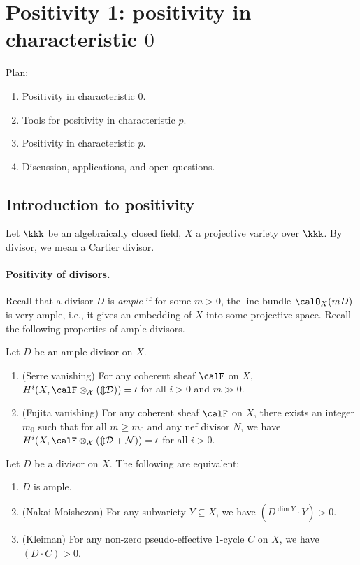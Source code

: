 \section[Positivity 1: positivity in characteristic 0]{Positivity 1: positivity in characteristic $0$}

Plan:
\begin{enumerate}[label=(\arabic*)]
	\item Positivity in characteristic $0$.
	\item Tools for positivity in characteristic $p$.
	\item Positivity in characteristic $p$.
	\item Discussion, applications, and open questions.
\end{enumerate}


\subsection{Introduction to positivity}

Let $\kkk$ be an algebraically closed field, $X$ a projective variety over $\kkk$.
By divisor, we mean a Cartier divisor.

\paragraph{Positivity of divisors.}
Recall that a divisor $D$ is \emph{ample} if for some $m>0$, the line bundle $\calO_X(mD)$ is very ample, i.e., it gives an embedding of $X$ into some projective space.
Recall the following properties of ample divisors.

\begin{theorem}
	Let $D$ be an ample divisor on $X$.
	\begin{enumerate}
		\item (Serre vanishing) For any coherent sheaf $\calF$ on $X$, $H^i(X, \calF\otimes \cal_X(mD))=0$ for all $i>0$ and $m\gg 0$.
		\item (Fujita vanishing) For any coherent sheaf $\calF$ on $X$, there exists an integer $m_0$ such that for all $m\ge m_0$ and any nef divisor $N$, we have $H^i(X, \calF\otimes \cal_X(mD+N))=0$ for all $i>0$.
	\end{enumerate}
\end{theorem}

\begin{theorem}
	Let $D$ be a divisor on $X$.
	The following are equivalent:
	\begin{enumerate}
		\item $D$ is ample.
		\item (Nakai-Moishezon) For any subvariety $Y\subseteq X$, we have $(D^{\dim Y}\cdot Y)>0$.
		\item (Kleiman) For any non-zero pseudo-effective $1$-cycle $C$ on $X$, we have $(D\cdot C)>0$.
	\end{enumerate}
\end{theorem}

